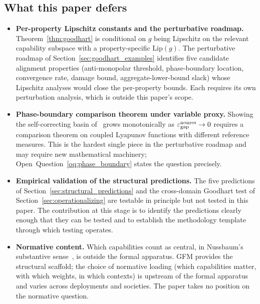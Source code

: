 \subsection{What this paper defers}
\label{sec:deferred}

\begin{itemize}
\item \textbf{Per-property Lipschitz constants and the
  perturbative roadmap.}
  Theorem~\ref{thm:goodhart} is conditional on $g$ being
  Lipschitz on the relevant capability subspace with a
  property-specific $\mathrm{Lip}(g)$.  The perturbative
  roadmap of Section~\ref{sec:goodhart_examples} identifies
  five candidate alignment properties (anti-monopolar
  threshold, phase-boundary location, convergence rate, damage
  bound, aggregate-lower-bound slack) whose Lipschitz analyses
  would close the per-property bounds.  Each requires its own
  perturbation analysis, which is outside this paper's scope.

\item \textbf{Phase-boundary comparison theorem under variable
  proxy.}  Showing the self-correcting basin
  of~\citep[Phase~Redundancy]{lasser2026phase} grows
  monotonically as $\varepsilon_{\mathrm{gap}}^{\mathrm{nonres}} \to 0$ requires a comparison
  theorem on coupled Lyapunov functions with different
  reference measures.  This is the hardest single piece in the
  perturbative roadmap and may require new mathematical
  machinery; Open~Question~\ref{oq:phase_boundary} states the
  question precisely.

\item \textbf{Empirical validation of the structural
  predictions.}
  The five predictions of Section~\ref{sec:structural_predictions}
  and the cross-domain Goodhart test of
  Section~\ref{sec:operationalizing} are testable in principle
  but not tested in this paper.  The contribution at this stage
  is to identify the predictions clearly enough that they can be
  tested and to establish the methodology template through
  which testing operates.

\item \textbf{Normative content.}  Which capabilities count as
  central, in Nussbaum's substantive
  sense~\citep{nussbaum2000women,nussbaum2011creating}, is
  outside the formal apparatus.  GFM provides the structural
  scaffold; the choice of normative loading (which
  capabilities matter, with which weights, in which
  contexts) is upstream of the formal apparatus and varies
  across deployments and societies.  The paper takes no
  position on the normative question.
\end{itemize}

